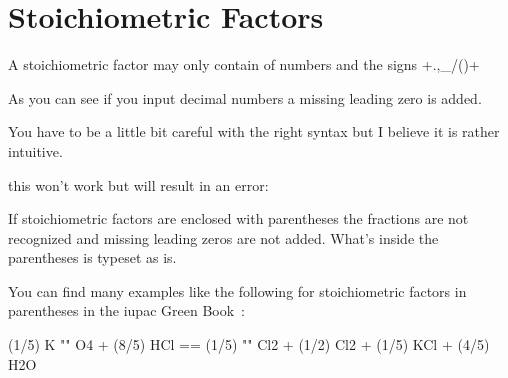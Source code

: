 \documentclass[load-preamble+]{cnltx-doc}
\begin{document}

\section{Stoichiometric Factors}
A stoichiometric factor may only contain of numbers and the signs
\verbcode+.,_/()+
\begin{example}
   \par

  % decimals:
   \par

   \par
 
\end{example}

As you can see if you input decimal numbers a missing leading zero is added.

You have to be a little bit careful with the right syntax but I believe it is
rather intuitive.
\begin{sourcecode}
  this won't work but will result in an error: 
\end{sourcecode}

If stoichiometric factors are enclosed with parentheses the fractions are not
recognized and missing leading zeros are not added.  What's inside the
parentheses is typeset as is.
\begin{example}
    
\end{example}
You can find many examples like the following for stoichiometric factors in
parentheses in the \acs{iupac} Green Book~\cite{iupac:greenbook}:
\begin{reaction*}
 (1/5) K "" O4 + (8/5) HCl == (1/5) "" Cl2 + (1/2) Cl2 + (1/5) KCl + (4/5) H2O
\end{reaction*}
\end{document}
